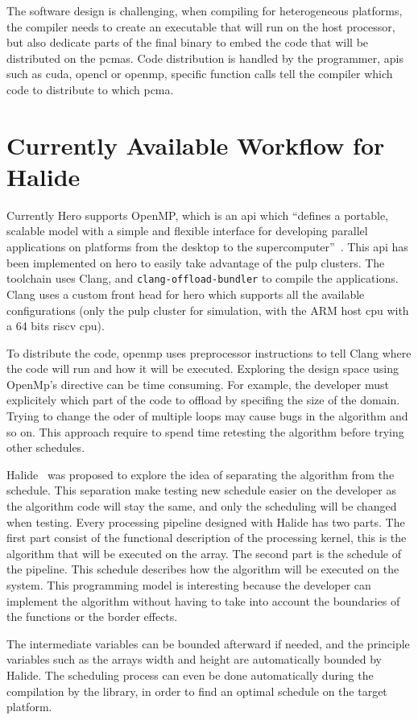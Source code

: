     The software design is challenging, when compiling for heterogeneous platforms,  the compiler needs to create an executable that will run on the host processor, but also dedicate parts of the final binary to embed the code that will be distributed on the \glspl{pcma}. Code distribution is handled by the programmer, \glspl{api} such as \gls{cuda}, \gls{opencl} or \gls{openmp}, specific function calls tell the compiler which code to distribute to which \gls{pcma}.


\section {Currently Available Workflow for Halide}
    Currently Hero supports OpenMP, which is an \gls{api} which ``defines a portable, scalable model with a simple and flexible interface for developing parallel applications on platforms from the desktop to the supercomputer''~\cite{Web:OpenMp}. This \gls{api} has been implemented on \gls{hero} to easily take advantage of the \gls{pulp} clusters. The toolchain uses Clang, and  \verb|clang-offload-bundler| to compile the applications. Clang uses a custom front head for \gls{hero} which supports all the available configurations (only the \gls{pulp} cluster for simulation, with the ARM host \gls{cpu}  with a 64 bits \gls{riscv} \gls{cpu}).

	To distribute the code, \gls{openmp} uses preprocessor instructions to tell Clang where the code will run and how it will be executed. Exploring the design space using OpenMp's directive can be time consuming. For example, the developer must explicitely which part of the code to offload by specifing the size of the domain. Trying to change the oder of multiple loops may cause bugs in the algorithm and so on. This approach require to spend time retesting the algorithm before trying other schedules.


	Halide~\cite{Art:Halide} was proposed to explore the idea of separating the algorithm from the schedule.
	This separation make testing new schedule easier on the developer as the algorithm code will stay the same, and only the scheduling will be changed when testing.
    Every processing pipeline designed with Halide has two parts. The first part consist of the functional description of the processing kernel, this is the algorithm that will be executed on the array. The second part is the schedule of the pipeline. This schedule describes how the algorithm will be executed on the system. 
	This programming model is interesting because the developer can implement the algorithm without having to take into account the boundaries of the functions or the border effects. 

	The intermediate variables can be bounded afterward if needed, and the principle variables such as the arrays width and height are automatically bounded by Halide.
	The scheduling process can even be done automatically during the compilation by the library, in order to find an optimal schedule on the target platform.



